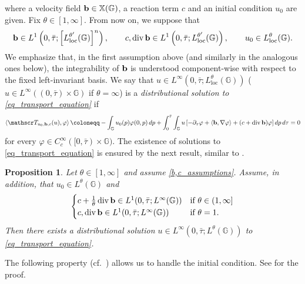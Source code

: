 \documentclass[11pt]{amsart}
\newcommand{\bb}{{\bf {b}}} %
\DeclareMathOperator{\divv}{div}
\theoremstyle{plain}
\newtheorem{proposition}[theorem]{Proposition}
\theoremstyle{definition}
\theoremstyle{remark}
\numberwithin{equation}{section}
\begin{document}
where a velocity field $\bb\in \mathbb{X}(\mathbb{G})$, a reaction term $c$ and an initial condition $u_0$ are given. Fix $\theta \in [1,\infty]$. From now on, we suppose that
\begin{equation} \label{b,c_assumptions}
\bb\in L^1\left(0,\bar{\tau};\left[L^{\theta'}_{\mathrm{loc}}(\mathbb{G})\right]^n\right), \qquad c,\divv \bb \in L^1\left(0,\bar{\tau};L^{\theta'}_{\mathrm{loc}}(\mathbb{G})\right),\qquad u_0\in L^\theta_{\mathrm{loc}}(\mathbb{G}).
\end{equation}
We emphasize that, in the first assumption above (and similarly in the analogous ones below), the integrability of $\bb$ is understood component-wise with respect to the fixed left-invariant basis. We say that $u \in L^\infty\left(0,\bar{\tau};L^\theta_{\mathrm{loc}}(\mathbb{G})\right)$ ($u\in L^\infty((0,\bar\tau)\times\mathbb{G})$ if $\theta=\infty$) is a \emph{distributional solution to \eqref{eq_transport_equation}} if
\begin{equation*}
 \left\langle \mathscr T_{u_0,\bb,c}(u),\varphi\right\rangle\coloneqq-\int_{\mathbb{G}}u_0(p)\varphi(0,p)\,dp+\int_{0}^{\bar{\tau}}\int_{\mathbb{G}}u\left[-\partial_\tau\varphi+\langle\bb, \nabla \varphi \rangle+(c+\divv\bb)\varphi\right] dp\,d\tau=0 
\end{equation*}
for every $\varphi\in C_c^\infty([0,\bar{\tau})\times\mathbb{G})$. The existence of solutions to \eqref{eq_transport_equation} is ensured by the next result, similar to \cite[Proposition II.1]{MR1022305}.
\begin{proposition} \label{prop_existence}
Let $\theta \in [1,\infty]$ and assume \eqref{b,c_assumptions}. Assume, in addition, that $u_0 \in L^\theta(\mathbb{G})$ and
\begin{equation*}
\begin{cases}
c+\frac{1}{\theta}\divv \bb \in L^1(0,\bar{\tau};L^\infty(\mathbb{G})) & \text{if $\theta \in (1,\infty]$}\\
c, \divv \bb \in L^1(0,\bar{\tau};L^\infty(\mathbb{G})) & \text{if $\theta=1$}.
\end{cases}
\end{equation*}
Then there exists a distributional solution $u \in L^\infty\left(0,\bar{\tau};L^\theta(\mathbb{G})\right)$ to \eqref{eq_transport_equation}.
\end{proposition}
The following property (cf.~\cite{AST_2008__317__175_0}) allows us to handle the initial condition. See \cite[Proposition 4.3]{dpl1} for the proof.
\end{document}
